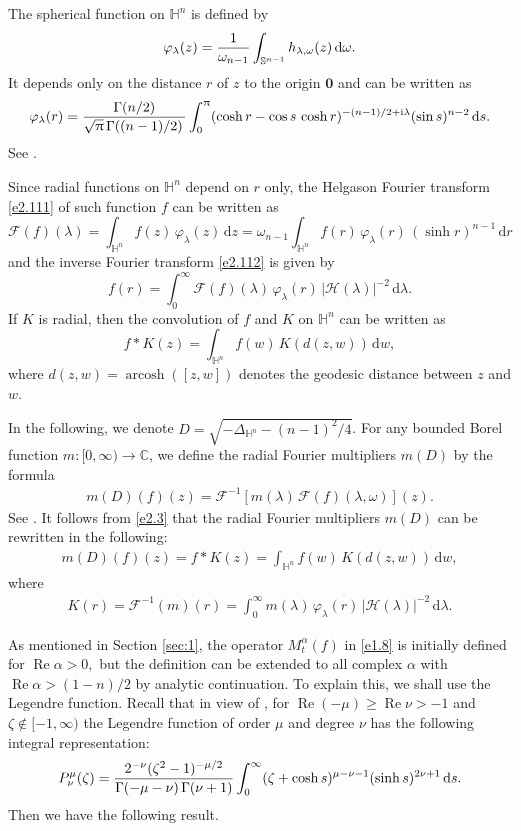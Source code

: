 \documentclass[11pt]{amsproc}
\newcommand{\arcosh}{\mathop{\mathrm{arcosh}}}
\newcommand{\0}{\mathbf{0}}
\newcommand{\bc}{{ \mathcal{H} }}
\newcommand{\F}{\mathscr{F}}
\renewcommand{\Re}{\mathop{\mathrm{Re}}}
\renewcommand{\H}{\mathbb{H}}
\renewcommand{\i}{\mathrm{i}}
\renewcommand{\d}{\mathrm{d}}
\numberwithin{equation}{section}
\numberwithin{figure}{section}
\theoremstyle{definition}
\theoremstyle{remark}
\numberwithin{thm}{section}
\begin{document}
The spherical function on $\H^n$ is defined by
\begin{eqnarray*}
\varphi_\lambda(z)={1\over \omega_{n-1}} \int_{{\mathbb S^{n-1}}} h_{\lambda, \omega}(z)\, \d\omega.
\end{eqnarray*}
It depends only on the distance $r$ of $z$ to the origin $\0$ and can be written as
\begin{eqnarray}\label{e2.4}
\varphi_\lambda(r)={\Gamma(n/2)\over \sqrt{\uppi}\,\Gamma((n-1)/2)\,}    \int_0^\uppi (\cosh r-\cos s\,\cosh r)^{-(n-1)/2+\i\lambda}(\sin s)^{n-2}\,\d s.
\end{eqnarray}
See \cite{Vi}.

Since radial   functions on $\H^n$ depend on $r$ only, the Helgason Fourier transform \eqref{e2.111} of such function $f$ can be written as
$$
{\F}(f)(\lambda)=\int_{\H^n}f(z)\,\varphi_\lambda(z)\,\d z=\omega_{n-1}\int_{\H^n} f(r)\, \varphi_\lambda(r) \,(\sinh r)^{n-1}\, \d r
$$
and the inverse Fourier transform \eqref{e2.112} is  given by
$$
f(r)=  \int_0^{\infty} {\F}(f)(\lambda )\,
\varphi_\lambda(r)\, |\bc(\lambda)|^{-2}\, \d\lambda.
$$
If $K$ is radial, then the convolution of $f$ and $K$ on $\H^n$ can be written as
$$
f\ast K(z)=\int_{\H^n} f(w) \,K(d(z, w)) \,\d w,
$$
where $d(z,w)= \arcosh ([z, w])$  denotes the geodesic distance between $z$ and $w$.



In the following, we denote  $D=\sqrt{-\Delta_{	\H^n} -(n-1)^2/4}$.
For any bounded Borel function $m:[0, \infty)\to {\mathbb C}$,  we define the
radial Fourier multipliers $m(D)$ by the formula
\begin{eqnarray}\label{e2.3}
m(D)(f)(z)= {\F}^{-1}[ m(\lambda)\, {\F}(f)(\lambda, \omega)](z).
\end{eqnarray}
See \cite[p. 10]{GeLe}. It follows from  \eqref{e2.3} that  the
radial Fourier multipliers $m(D)$  can be rewritten in the following:
\begin{eqnarray*}
m(D)(f)(z)=f*K(z)=\int_{\H^n}f(w)\,K(d(z,w))\,\d w,
\end{eqnarray*}
where
\begin{eqnarray*}
K(r)=\F^{-1}(m)(r)=\int_0^\infty m(\lambda)\,\varphi_\lambda(r)\,|\bc(\lambda)|^{-2}\,\d\lambda.
\end{eqnarray*}
\smallskip

As mentioned in Section \ref{sec:1}, the  operator $M^\alpha_t(f)$ in  \eqref{e1.8}  is  initially defined for $\Re \alpha >0,$   but the definition can be extended to all complex $\alpha$ with   $\Re \alpha> (1-n)/2$ by analytic continuation.
To explain this, we shall use the Legendre function. Recall that
in view of \cite[p. 155, (1)]{Er}, for $\Re(-\mu)\geq \Re\nu>-1$ and $\zeta\notin[-1,\infty)$   the Legendre function of order $\mu$ and degree $\nu$ has the following integral representation:
\begin{eqnarray*}
P^\mu_\nu(\zeta)={2^{-\nu}(\zeta^2-1)^{-\mu/2}\over \Gamma(-\mu-\nu)\,\Gamma(\nu+1)}\int_0^\infty (\zeta+\cosh s)^{\mu-\nu-1}(\sinh s)^{2\nu+1}\,\d s.
\end{eqnarray*}
Then we have the following result.
\end{document}
